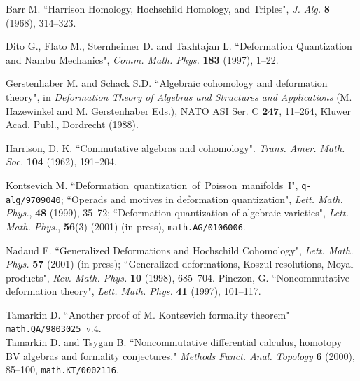 \documentclass[a4paper,a4paper]{article}
\begin{document}
\frenchspacing
\begin{thebibliography}{9}
\vspace*{-2mm}

Barr M. 
``Harrison Homology, Hochschild Homology, and Triples", 
\textit{J. Alg.} {\bf 8} (1968), 314--323.

Dito G., Flato M., Sternheimer D. and Takhtajan L. 
``Deformation Quantization and Nambu Mechanics", 
\textit{Comm. Math. Phys.} {\bf 183} (1997), 1--22.

Gerstenhaber M. and Schack S.D. 
``Algebraic cohomology and deformation theory", in 
\textit{Deformation Theory of Algebras and Structures and
Applications} (M. Hazewinkel and M. Gerstenhaber Eds.), NATO ASI Ser. C
{\bf 247}, 11--264, Kluwer Acad. Publ., Dordrecht (1988).

Harrison, D. K. 
``Commutative algebras and cohomology". 
\textit{Trans. Amer. Math. Soc.} {\bf 104} (1962), 191--204.

Kontsevich M. 
``Deformation~quantization~of~Poisson~manifolds~I",
\texttt{q-alg/9709040};
``Operads and motives in deformation quantization", 
\textit{Lett. Math. Phys.}, \textbf{48} (1999), 35--72;  
``Deformation quantization of algebraic varieties", 
\textit{Lett. Math. Phys.}, \textbf{56}(3) (2001) (in press), 
\texttt{math.AG/0106006}. 

Nadaud F. 
``Generalized Deformations and Hochschild Cohomology",
\textit{Lett. Math. Phys.} \textbf{57} (2001) (in press);
``Generalized deformations, Koszul resolutions, Moyal products",
\textit{Rev. Math. Phys.} \textbf{10} (1998), 685--704.
Pinczon, G. 
``Noncommutative deformation theory", 
\textit{Lett. Math. Phys.} \textbf{41} (1997), 101--117.

Tamarkin D. 
``Another proof of M. Kontsevich formality theorem"
\texttt{math.QA/9803025}~v.4.  \\%
Tamarkin D. and Tsygan B. ``Noncommutative differential calculus, 
homotopy BV algebras and formality conjectures." 
\textit{Methods Funct. Anal. Topology} \textbf{6} (2000), 85--100,
\texttt{math.KT/0002116}.
\end{thebibliography}
\end{document}
